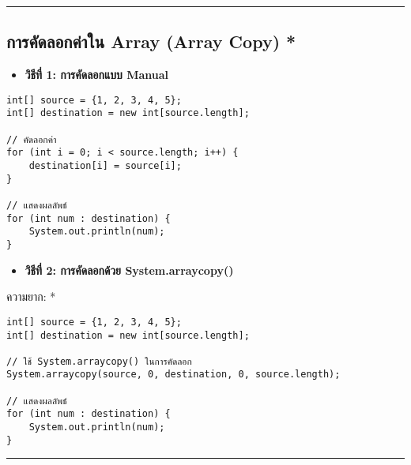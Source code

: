 \documentclass[11pt]{article}
\begin{document}
\noindent\rule{\textwidth}{0.5pt}
\subsection{การคัดลอกค่าใน Array (Array Copy) *}
\label{sec:org5bb3115}
\begin{itemize}
\item \textbf{วิธีที่ 1: การคัดลอกแบบ Manual}
\end{itemize}
\begin{verbatim}
int[] source = {1, 2, 3, 4, 5};
int[] destination = new int[source.length];

// คัดลอกค่า
for (int i = 0; i < source.length; i++) {
    destination[i] = source[i];
}

// แสดงผลลัพธ์
for (int num : destination) {
    System.out.println(num);
}
\end{verbatim}

\begin{itemize}
\item \textbf{วิธีที่ 2: การคัดลอกด้วย System.arraycopy()}
\end{itemize}
ความยาก: *
\begin{verbatim}
int[] source = {1, 2, 3, 4, 5};
int[] destination = new int[source.length];

// ใช้ System.arraycopy() ในการคัดลอก
System.arraycopy(source, 0, destination, 0, source.length);

// แสดงผลลัพธ์
for (int num : destination) {
    System.out.println(num);
}
\end{verbatim}

\noindent\rule{\textwidth}{0.5pt}
\end{document}
